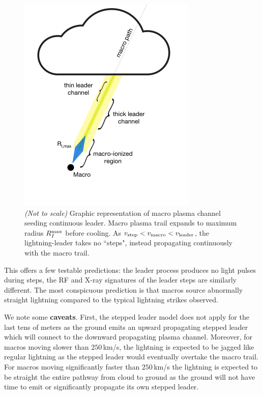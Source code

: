 \documentclass[%
 reprint,
 amsmath,amssymb,
 aps,
]{revtex4-2}
\begin{document}
        \begin{figure}[h]
            \centering
            \includegraphics[width=\linewidth]{macro_schematic/macro_schematic.pdf}
            \caption{\textit{(Not to scale)} Graphic representation of macro plasma channel seeding continuous leader. Macro plasma trail expands to maximum radius $R_{I}^{\rm{max}}$ before cooling. As $v_{\rm{step}} < v_{\rm{macro}} < v_{\rm{leader}}$, the lightning-leader takes no ``steps", instead propagating continuously with the macro trail.}
            \label{fig:macro_graphic}
        \end{figure}

        This offers a few testable predictions: the leader process produces no light pulses during steps, the RF and X-ray signatures of the leader steps are similarly different. The most conspicuous prediction is that {macros source abnormally straight lightning} compared to the typical lightning strikes observed.

        We note some \textbf{caveats}. First, the stepped leader model does not apply for the last tens of meters as the ground emits an upward propagating stepped leader which will connect to the downward propagating plasma channel. Moreover, for macros moving slower than $250\,$km/s, the lightning is expected to be jagged like regular lightning as the stepped leader would eventually overtake the macro trail. For macros moving significantly faster than $250\,$km/s the lightning is expected to be straight the entire pathway from cloud to ground as the ground will not have time to emit or significantly propagate its own stepped leader. 
\end{document}
